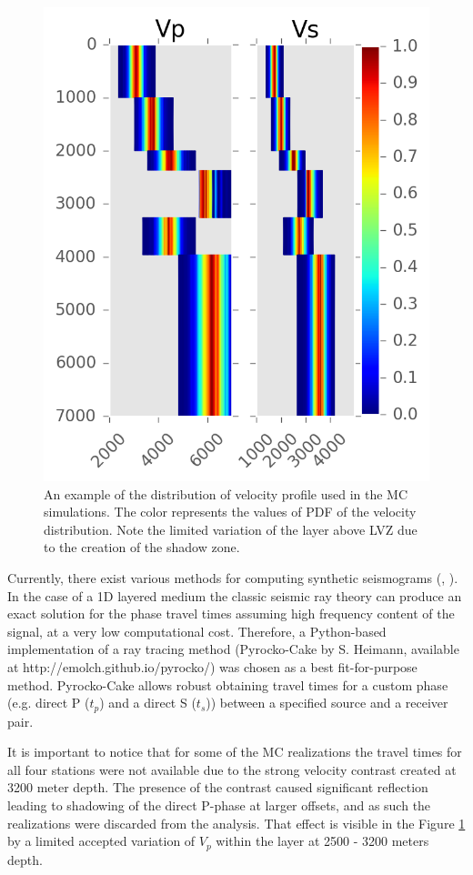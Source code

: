 \begin{figure}[htb]
\begin{center}
\includegraphics[width=0.7\linewidth,angle=0]{./AntonBiryukov_bibtex/VpVs.png}
\end{center}
\vspace{-4mm}
\caption{An example of the distribution of velocity profile used in the MC simulations. The color represents the values of PDF of the velocity distribution. Note the limited variation of the layer above LVZ due to the creation of the shadow zone.}
\label{fig:vpvs}
\end{figure}

Currently, there exist various methods for computing synthetic seismograms (\citet{kennett_seismic_2001}, \citet{chapman_fundamentals_2004}). In the case of a 1D layered medium the classic seismic ray theory can produce an exact solution for the phase travel times assuming high frequency content of the signal, at a very low computational cost. Therefore, a Python-based implementation of a ray tracing method (Pyrocko-Cake by S. Heimann, available at http://emolch.github.io/pyrocko/) was chosen as a best fit-for-purpose method. Pyrocko-Cake allows robust obtaining travel times for a custom phase (e.g. direct P ($t_{p}$) and a direct S ($t_{s}$)) between a specified source and a receiver pair.


It is important to notice that for some of the MC realizations the travel times for all four stations were not available due to the strong velocity contrast created at 3200 meter depth. The presence of the contrast caused significant reflection leading to shadowing of the direct P-phase at larger offsets, and as such the realizations were discarded from the analysis. That effect is visible in the Figure \ref{fig:vpvs} by a limited accepted variation of $V_{p}$ within the layer at 2500 - 3200 meters depth.

